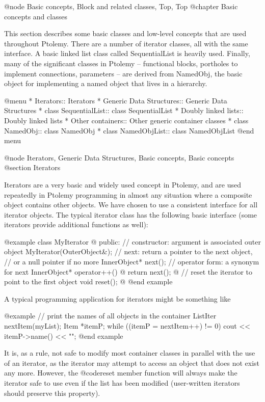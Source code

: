 @node Basic concepts, Block and related classes, Top, Top
@chapter Basic concepts and classes

This section describes some basic classes and low-level concepts that
are used throughout Ptolemy.  There are a number of iterator classes,
all with the same interface.  A basic linked list class called
SequentialList is heavily used.  Finally, many of the significant
classes in Ptolemy -- functional blocks, portholes to implement
connections, parameters -- are derived from NamedObj, the basic object
for implementing a named object that lives in a hierarchy.

@menu
* Iterators::                   Iterators
* Generic Data Structures::     Generic Data Structures
* class SequentialList::        class SequentialList
* Doubly linked lists::         Doubly linked lists
* Other containers::            Other generic container classes
* class NamedObj::              class NamedObj
* class NamedObjList::          class NamedObjList
@end menu

@node Iterators, Generic Data Structures, Basic concepts, Basic concepts
@section Iterators

Iterators are a very basic and widely used concept in Ptolemy, and are
used repeatedly in Ptolemy programming in almost any situation where a
composite object contains other objects.  We have chosen to use a
consistent interface for all iterator objects.  The typical iterator
class has the following basic interface (some iterators provide additional
functions as well):

@example
class MyIterator @{
public:
    // constructor: argument is associated outer object
    MyIterator(OuterObject&);
    // next: return a pointer to the next object,
    // or a null pointer if no more
    InnerObject* next();
    // operator form: a synonym for next
    InnerObject* operator++() @{ return next(); @}
    // reset the iterator to point to the first object
    void reset();
@}
@end example

A typical programming application for iterators might be something like

@example
// print the names of all objects in the container
ListIter nextItem(myList);
Item *itemP;
while ((itemP = nextItem++) != 0)
    cout << itemP->name() << "\n";
@end example

It is, as a rule, not safe to modify most container classes in parallel
with the use of an iterator, as the iterator may attempt to access an
object that does not exist any more.  However, the @code{reset} member
function will always make the iterator safe to use even if the list has
been modified (user-written iterators should preserve this property).

